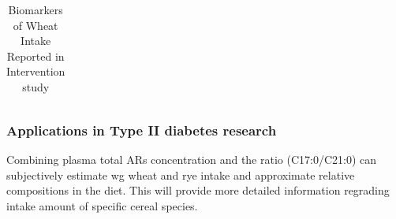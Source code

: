 \begin{table}[h!]
{\begin{tabular}{|c|c|c|c|c|c|c|c|c|}
\end{tabular} }
\caption{Biomarkers of Wheat Intake Reported in Intervention study}
\label{table:wheat_intervention}
\end{table}


%			

\subsubsection{Applications in Type II diabetes research}
Combining plasma total ARs concentration and the ratio (C17:0/C21:0) can subjectively estimate \acrshort{wg} wheat and rye intake and approximate relative compositions in the diet. This will provide more detailed information regrading intake amount of specific cereal species.

